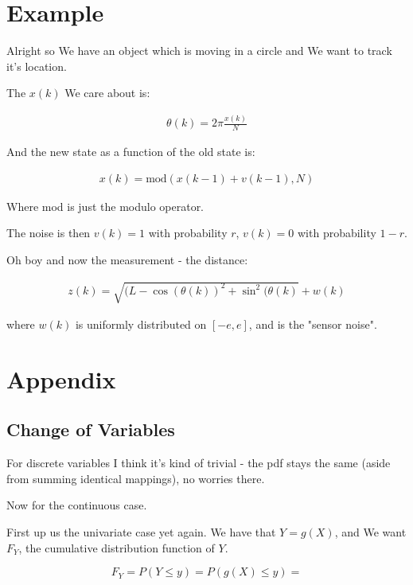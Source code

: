 \documentclass{article}
\begin{document}
		
\section{Example}

	Alright so We have an object which is moving in a circle and We want to track it's location.
	
	The $x(k)$ We care about is:
	
	\begin{align}
		\theta(k) = 2\pi\frac{x(k)}{N}
	\end{align}
		
	And the new state as a function of the old state is:
	
	\begin{align}
		x(k) = \text{mod}(x(k-1) + v(k-1), N)
	\end{align}
	
	Where mod is just the modulo operator.
	
	The noise is then $v(k)=1$ with probability $r$, $v(k)=0$ with probability $1-r$.
		
	Oh boy and now the measurement - the distance:
	
	\begin{align}
		z(k) = \sqrt{(L-\cos(\theta(k))^2 + \sin^2(\theta(k)} + w(k)
	\end{align}
	
	where $w(k)$ is uniformly distributed on $[-e, e]$, and is the "sensor noise".
	
	
		
\newpage
\section{Appendix}
	\subsection{Change of Variables}
	
		For discrete variables I think it's kind of trivial - the pdf stays the same (aside from summing identical mappings), no worries there.
		
		Now for the continuous case. 
		
		First up us the univariate case yet again. We have that $Y = g(X)$, and We want $F_Y$, the cumulative distribution function of $Y$.
		
		\[ F_Y = P(Y\le y) = P(g(X) \le y) = \]
		
		
	
\end{document}
